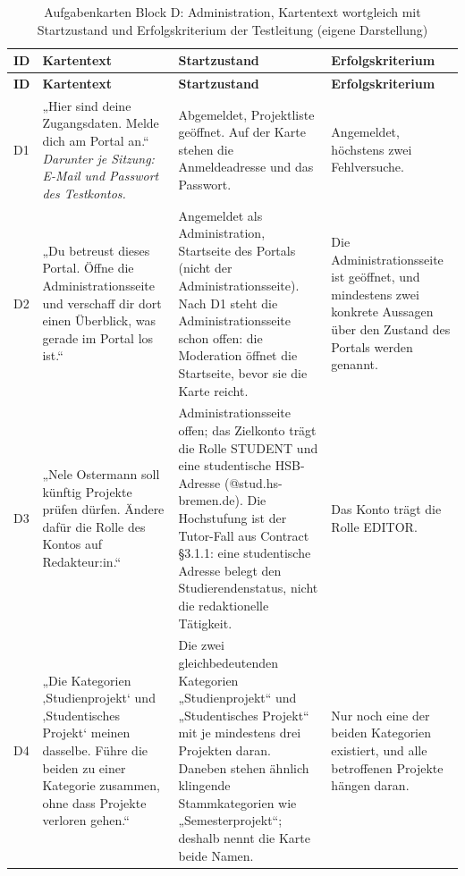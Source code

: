 \begingroup
\scriptsize
\setlength{\tabcolsep}{3pt}
\renewcommand{\arraystretch}{1.12}
\setlength{\LTcapwidth}{\textwidth}
\begin{longtable}{@{}L{0.6cm}L{6.1cm}L{3.8cm}L{4.2cm}@{}}
	\caption[Aufgabenkarten Block D: Administration]{Aufgabenkarten Block D: Administration, Kartentext wortgleich mit Startzustand und Erfolgskriterium der Testleitung (eigene Darstellung)}
	\label{tab:karten-d}\\
	\toprule
	\textbf{ID} & \textbf{Kartentext} & \textbf{Startzustand} & \textbf{Erfolgskriterium} \\
	\midrule
	\endfirsthead
	\toprule
	\textbf{ID} & \textbf{Kartentext} & \textbf{Startzustand} & \textbf{Erfolgskriterium} \\
	\midrule
	\endhead
	\bottomrule
	\endfoot
	D1 & „Hier sind deine Zugangsdaten. Melde dich am Portal an.“ \newline \textit{Darunter je Sitzung: E-Mail und Passwort des Testkontos.} & Abgemeldet, Projektliste geöffnet. Auf der Karte stehen die Anmeldeadresse und das Passwort. & Angemeldet, höchstens zwei Fehlversuche. \\
	D2 & „Du betreust dieses Portal. Öffne die Administrationsseite und verschaff dir dort einen Überblick, was gerade im Portal los ist.“ & Angemeldet als Administration, Startseite des Portals (nicht der Administrationsseite). Nach D1 steht die Administrationsseite schon offen: die Moderation öffnet die Startseite, bevor sie die Karte reicht. & Die Administrationsseite ist geöffnet, und mindestens zwei konkrete Aussagen über den Zustand des Portals werden genannt. \\
	D3 & „Nele Ostermann soll künftig Projekte prüfen dürfen. Ändere dafür die Rolle des Kontos auf Redakteur:in.“ & Administrationsseite offen; das Zielkonto trägt die Rolle STUDENT und eine studentische HSB-Adresse (@stud.hs-bremen.de). Die Hochstufung ist der Tutor-Fall aus Contract §3.1.1: eine studentische Adresse belegt den Studierendenstatus, nicht die redaktionelle Tätigkeit. & Das Konto trägt die Rolle EDITOR. \\
	D4 & „Die Kategorien ‚Studienprojekt‘ und ‚Studentisches Projekt‘ meinen dasselbe. Führe die beiden zu einer Kategorie zusammen, ohne dass Projekte verloren gehen.“ & Die zwei gleichbedeutenden Kategorien „Studienprojekt“ und „Studentisches Projekt“ mit je mindestens drei Projekten daran. Daneben stehen ähnlich klingende Stammkategorien wie „Semesterprojekt“; deshalb nennt die Karte beide Namen. & Nur noch eine der beiden Kategorien existiert, und alle betroffenen Projekte hängen daran. \\

\end{longtable}
